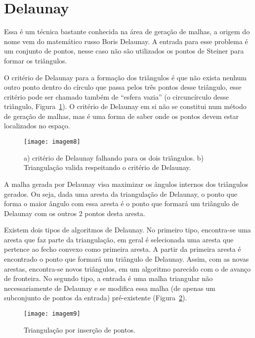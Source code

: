 \section{Delaunay}

Essa é um técnica bastante conhecida na área de geração de malhas, a origem do nome vem do matemático russo Boris Delaunay. A entrada para esse problema é um conjunto de pontos, nesse caso não são utilizados os pontos de Steiner para formar os triângulos.

O critério de Delaunay para a formação dos triângulos é que não exista nenhum outro ponto dentro do círculo que passa pelos três pontos desse triângulo, esse critério pode ser chamado também de “esfera vazia” (o circuncírculo desse triângulo, Figura~\ref{fig:imagem8}). O critério de Delaunay em si não se constitui num método de geração de malhas, mas é uma forma de saber onde os pontos devem estar localizados no espaço.

 \begin{figure}[htbp]
     \centering
     \texttt{[image: imagem8]}
     \caption{a) critério de Delaunay falhando para os dois triângulos. b) Triangulação valida respeitando o critério de Delaunay.} 
     \label{fig:imagem8}
 \end{figure}

A malha gerada por Delaunay visa maximizar os ângulos internos dos triângulos gerados. Ou seja, dada uma aresta da triangulação de Delaunay, o ponto que forma o maior ângulo com essa aresta é o ponto que formará um triângulo de Delaunay com os outros 2 pontos desta aresta.

Existem dois tipos de algoritmos de Delaunay. No primeiro tipo, encontra-se uma aresta que faz parte da triangulação, em geral é selecionada uma aresta que pertence ao fecho convexo como primeira aresta. A partir da primeira aresta é encontrado o ponto que formará um triângulo de Delaunay. Assim, com as novas arestas, encontra-se novos triângulos, em um algoritmo parecido com o de avanço de fronteira. No segundo tipo, a entrada é uma malha triangular não necessariamente de Delaunay e se modifica essa malha (de apenas um subconjunto de pontos da entrada) pré-existente (Figura~\ref{fig:imagem9}).

 \begin{figure}[htbp]
     \centering
     \texttt{[image: imagem9]}
     \caption{Triangulação por inserção de pontos. \cite{bib:Freitas10}} 
     \label{fig:imagem9}
 \end{figure}

